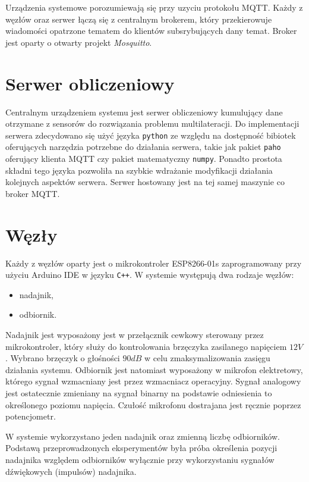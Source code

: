 Urządzenia systemowe porozumiewają się przy uzyciu protokołu MQTT. Każdy z węzłów oraz serwer łączą się z centralnym brokerem, który przekierowuje wiadomości opatrzone tematem do klientów subsrybujących dany temat. Broker jest oparty o otwarty projekt \textit{Mosquitto}.

\section{Serwer obliczeniowy}

Centralnym urządzeniem systemu jest serwer obliczeniowy kumulujący dane otrzymane z sensorów do rozwiązania problemu multilateracji. Do implementacji serwera zdecydowano się użyć języka \texttt{python} ze względu na dostępność bibiotek oferujących narzędzia potrzebne do działania serwera, takie jak pakiet \texttt{paho} oferujący klienta MQTT czy pakiet matematyczny \texttt{numpy}. Ponadto prostota składni tego języka pozwoliła na szybkie wdrażanie modyfikacji działania kolejnych aspektów serwera. Serwer hostowany jest na tej samej maszynie co broker MQTT.

\section{Węzły}

Każdy z węzłów oparty jest o mikrokontroler ESP8266-01s zaprogramowany przy użyciu Arduino IDE w języku \texttt{C++}. W systemie występują dwa rodzaje węzłów:
\begin{itemize}
  \item nadajnik,
  \item odbiornik.
\end{itemize}
Nadajnik jest wyposażony jest w przełącznik cewkowy sterowany przez mikrokontroler, który służy do kontrolowania brzęczyka zasilanego napięciem $12V$. Wybrano brzęczyk o głośności $90dB$ w celu zmaksymalizowania zasięgu działania systemu. Odbiornik jest natomiast wyposażony w mikrofon elektretowy, którego sygnał wzmacniany jest przez wzmacniacz operacyjny. Sygnał analogowy jest ostatecznie zmieniany na sygnał binarny na podstawie odniesienia to określonego poziomu napięcia. Czułość mikrofonu dostrajana jest ręcznie poprzez potencjometr. 

W systemie wykorzystano jeden nadajnik oraz zmienną liczbę odbiorników. Podstawą przeprowadzonych eksperymentów była próba określenia pozycji nadajnika względem odbiorników wyłącznie przy wykorzystaniu sygnałów dźwiękowych (impulsów) nadajnika.